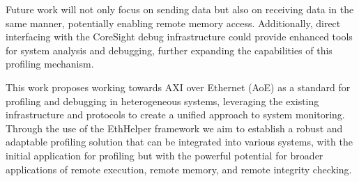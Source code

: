 Future work will not only focus on sending data but also on receiving data in the same manner, potentially enabling remote memory access. Additionally, direct interfacing with the CoreSight debug infrastructure could provide enhanced tools for system analysis and debugging, further expanding the capabilities of this profiling mechanism.

This work proposes working towards AXI over Ethernet (AoE) as a standard for profiling and debugging in heterogeneous systems, leveraging the existing infrastructure and protocols to create a unified approach to system monitoring. Through the use of the EthHelper framework we aim to establish a robust and adaptable profiling solution that can be integrated into various systems, with the initial application for profiling but with the powerful potential for broader applications of remote execution, remote memory, and remote integrity checking.










